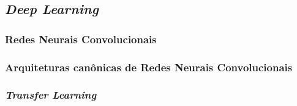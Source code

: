 
\subsection{\emph{Deep Learning}}
\label{subsec:dl}

\subsubsection{Redes Neurais Convolucionais}
\label{subsubsec:cnns}

\subsubsection{Arquiteturas canônicas de Redes Neurais Convolucionais}
\label{subsubsec:arq-cnns}

\subsubsection{\emph{Transfer Learning}}
\label{subsubsec:transfer}